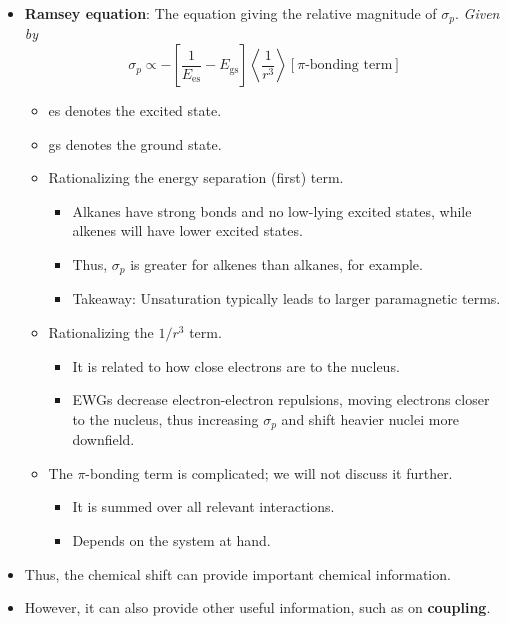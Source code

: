 \documentclass[../notes.tex]{subfiles}
\begin{document}
\begin{itemize}
\begin{itemize}
\begin{itemize}
        \end{itemize}
    \end{itemize}
    \item \textbf{Ramsey equation}: The equation giving the relative magnitude of $\sigma_p$. \emph{Given by}
    \begin{equation*}
        \sigma_p \propto -\left[ \frac{1}{E_\text{es}}-E_\text{gs} \right]\left\langle \frac{1}{r^3} \right\rangle[\pi\text{-bonding term}]
    \end{equation*}
    \begin{itemize}
        \item es denotes the excited state.
        \item gs denotes the ground state.
        \item Rationalizing the energy separation (first) term.
        \begin{itemize}
            \item Alkanes have strong bonds and no low-lying excited states, while alkenes will have lower excited states.
            \item Thus, $\sigma_p$ is greater for alkenes than alkanes, for example.
            \item Takeaway: Unsaturation typically leads to larger paramagnetic terms.
        \end{itemize}
        \item Rationalizing the $1/r^3$ term.
        \begin{itemize}
            \item It is related to how close electrons are to the nucleus.
            \item EWGs decrease electron-electron repulsions, moving electrons closer to the nucleus, thus increasing $\sigma_p$ and shift heavier nuclei more downfield.
        \end{itemize}
        \item The $\pi$-bonding term is complicated; we will not discuss it further.
        \begin{itemize}
            \item It is summed over all relevant interactions.
            \item Depends on the system at hand.
        \end{itemize}
    \end{itemize}
    \item Thus, the chemical shift can provide important chemical information.
    \item However, it can also provide other useful information, such as on \textbf{coupling}.

\end{itemize}
\end{document}
